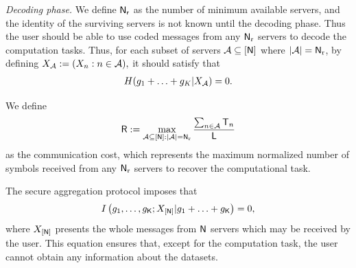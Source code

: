 \documentclass[conference,letterpaper]{IEEEtran}
\begin{document}
{\it Decoding phase.}
 We define ${\sf N_r}$ as  the number of minimum available servers, and the identity of the surviving servers is not known until the decoding phase. 
Thus the user should be able to use coded messages from any ${\sf N}_{\rm r}$  servers to decode the computation tasks. 
Thus, for each subset of servers ${\cal A} \subseteq [{\sf N}]$ where $|{\cal A}| = {\sf N}_{\rm r}$, by defining
$
    {X_{{\cal A}}}: = ( {X_n}:n \in {\cal A}), 
$
it should satisfy that
\begin{align}
    H(g_1+\ldots+g_K | X_{{\cal A}}) = 0.
\end{align}

We define 
\begin{equation}
    {\sf R}: = \mathop {\max }\limits_{{\cal A} \subseteq [{\sf N}]:|{\cal A}| = {{\sf N}_{\rm r}}} \frac{{\sum\nolimits_{n \in {\cal A}} {{{\sf T}_n}} }}{{\sf L}}
\end{equation} 
as the communication cost, which represents the maximum normalized number of symbols received from any ${\sf N}_{\rm r}$ servers to recover the computational task.

The secure aggregation protocol imposes that  
\begin{align}
    I\left(g_{1},\ldots, g_{{\sf K}};   X_{[{\sf N}]} | g_1+\ldots+g_{{\sf K}}  \right) = 0,
\end{align}
where $X_{[{\sf N}]}$ presents the whole messages from ${\sf N}$ servers which may be received by the user. This equation ensures that, except for the computation task, the user cannot obtain any information about the datasets.
\end{document}
